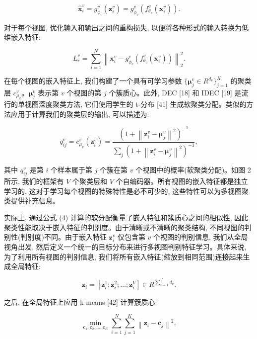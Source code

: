 \documentclass{article}
\begin{document}
\begin{equation}
    \hat{\mathbf{x}}^v_i = g^v_{\phi_v}(\mathbf{z}^v_i) = g^v_{\phi_v}(f^v_{\theta_v}(\mathbf{x}^v_i)).
\end{equation}

对于每个视图, 优化输入和输出之间的重构损失, 以便将各种形式的输入转换为低维嵌入特征:

\begin{equation}
    L^v_r = \sum_{i=1}^{N} \left\| \mathbf{x}^v_i - g^v_{\phi_v}(f^v_{\theta_v}(\mathbf{x}^v_i)) \right\|^2_2.
\end{equation}

在每个视图的嵌入特征上, 我们构建了一个具有可学习参数 $\{ \boldsymbol{\mu}^v_j \in R^{d_v} \}^K_{j=1}$ 的聚类层 $c^v_{\mu_v}$。$\boldsymbol{\mu}^v_j$ 表示第 $v$ 个视图的第 $j$ 个簇质心。此外, DEC [18] 和 IDEC [19] 是流行的单视图深度聚类方法, 它们使用学生的 t-分布 [41] 生成软聚类分配。类似的方法应用于计算我们的聚类层的输出, 可以描述为:

\begin{equation}
    q^v_{ij} = c^v_{\mu_v}(\mathbf{z}^v_i) = \frac{(1 + \left\| \mathbf{z}^v_i - \boldsymbol{\mu}^v_j \right\|^2)^{-1}}{\sum_j (1 + \left\| \mathbf{z}^v_i - \boldsymbol{\mu}^v_j \right\|^2)^{-1}},
\end{equation}

其中 $q^v_{ij}$ 是第 $i$ 个样本属于第 $j$ 个簇在第 $v$ 个视图中的概率(软聚类分配)。如图 2 所示, 我们的框架有 $V$ 个聚类层和 $V$ 个自编码器。所有视图的嵌入特征都是独立学习的, 这对于学习每个视图的特殊特性是必不可少的, 这些特性可以为多视图聚类提供补充信息。

实际上, 通过公式 (4) 计算的软分配衡量了嵌入特征和簇质心之间的相似性, 因此聚类性能取决于嵌入特征的判别度。由于清晰或不清晰的聚类结构, 不同视图的判别性(判别度)不同。由于嵌入特征 $\mathbf{z}^v_i$ 仅包含第 $v$ 个视图的判别信息, 我们从全局视角出发, 然后定义一个统一的目标分布来进行多视图判别特征学习。具体来说, 为了利用所有视图的判别信息, 我们将所有嵌入特征(缩放到相同范围)连接起来生成全局特征:

\begin{equation}
    \mathbf{z}_i = [\mathbf{z}^1_i; \mathbf{z}^2_i; \ldots; \mathbf{z}^V_i] \in R^{\sum_{v=1}^V d_v}.
\end{equation}

之后, 在全局特征上应用 k-means [42] 计算簇质心:

\begin{equation}
    \min_{\mathbf{c}_1, \mathbf{c}_2, \ldots, \mathbf{c}_K} \sum_{i=1}^{N} \sum_{j=1}^{K} \left\| \mathbf{z}_i - \mathbf{c}_j \right\|^2,
\end{equation}
\end{document}
